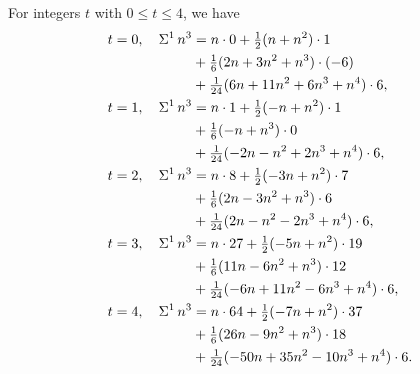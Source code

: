 \begin{example}
  For integers $t$ with $0 \leq t \leq 4$, we have
  \begin{align*}
    t=0, \quad \Sigma^{1}\,{n}^{3}
    &=
    n \cdot 0
    + \tfrac{1}{2}(n+n^2)\cdot 1 \\
    &+ \tfrac{1}{6}(2n+3n^2+n^3)\cdot(-6) \\
    &+ \tfrac{1}{24}(6n+11n^2+6n^3+n^4)\cdot 6,
    \\
    t=1, \quad \Sigma^{1}\,{n}^{3}
    &=
    n \cdot 1
    + \tfrac{1}{2}(-n+n^2)\cdot 1 \\
    &+ \tfrac{1}{6}(-n+n^3)\cdot 0 \\
    &+ \tfrac{1}{24}(-2n-n^2+2n^3+n^4)\cdot 6,
    \\
    t=2, \quad \Sigma^{1}\,{n}^{3}
    &=
    n \cdot 8
    + \tfrac{1}{2}(-3n+n^2)\cdot 7 \\
    &+ \tfrac{1}{6}(2n-3n^2+n^3)\cdot 6 \\
    &+ \tfrac{1}{24}(2n-n^2-2n^3+n^4)\cdot 6,
    \\
    t=3, \quad \Sigma^{1}\,{n}^{3}
    &=
    n \cdot 27
    + \tfrac{1}{2}(-5n+n^2)\cdot 19 \\
    &+ \tfrac{1}{6}(11n-6n^2+n^3)\cdot 12 \\
    &+ \tfrac{1}{24}(-6n+11n^2-6n^3+n^4)\cdot 6,
    \\
    t=4, \quad \Sigma^{1}\,{n}^{3}
    &=
    n \cdot 64
    + \tfrac{1}{2}(-7n+n^2)\cdot 37 \\
    &+ \tfrac{1}{6}(26n-9n^2+n^3)\cdot 18 \\
    &+ \tfrac{1}{24}(-50n+35n^2-10n^3+n^4)\cdot 6.
  \end{align*}
\end{example}
